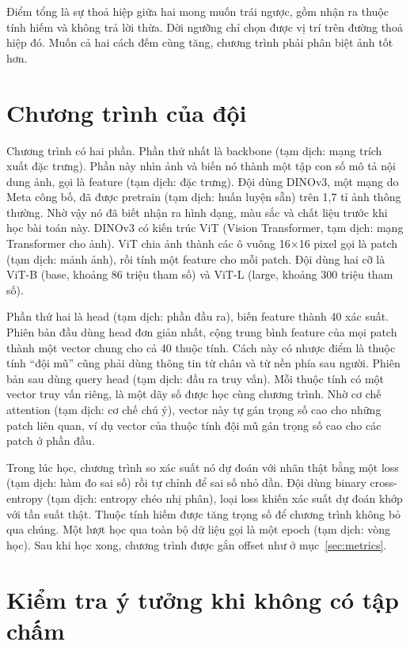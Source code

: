 \documentclass[11pt,a4paper]{article}
\begin{document}
\begin{ghichu}
Điểm tổng là sự thoả hiệp giữa hai mong muốn trái ngược, gồm nhận ra thuộc tính hiếm và không trả lời thừa. Dời ngưỡng chỉ chọn được vị trí trên đường thoả hiệp đó. Muốn cả hai cách đếm cùng tăng, chương trình phải phân biệt ảnh tốt hơn.
\end{ghichu}

\section{Chương trình của đội}
\label{sec:system}

Chương trình có hai phần. Phần thứ nhất là backbone (tạm dịch: mạng trích xuất đặc trưng). Phần này nhìn ảnh và biến nó thành một tập con số mô tả nội dung ảnh, gọi là feature (tạm dịch: đặc trưng). Đội dùng DINOv3, một mạng do Meta công bố, đã được pretrain (tạm dịch: huấn luyện sẵn) trên 1,7 tỉ ảnh thông thường. Nhờ vậy nó đã biết nhận ra hình dạng, màu sắc và chất liệu trước khi học bài toán này. DINOv3 có kiến trúc ViT (Vision Transformer, tạm dịch: mạng Transformer cho ảnh). ViT chia ảnh thành các ô vuông 16×16 pixel gọi là patch (tạm dịch: mảnh ảnh), rồi tính một feature cho mỗi patch. Đội dùng hai cỡ là ViT-B (base, khoảng 86 triệu tham số) và ViT-L (large, khoảng 300 triệu tham số).

Phần thứ hai là head (tạm dịch: phần đầu ra), biến feature thành 40 xác suất. Phiên bản đầu dùng head đơn giản nhất, cộng trung bình feature của mọi patch thành một vector chung cho cả 40 thuộc tính. Cách này có nhược điểm là thuộc tính ``đội mũ'' cũng phải dùng thông tin từ chân và từ nền phía sau người. Phiên bản sau dùng query head (tạm dịch: đầu ra truy vấn). Mỗi thuộc tính có một vector truy vấn riêng, là một dãy số được học cùng chương trình. Nhờ cơ chế attention (tạm dịch: cơ chế chú ý), vector này tự gán trọng số cao cho những patch liên quan, ví dụ vector của thuộc tính đội mũ gán trọng số cao cho các patch ở phần đầu.

Trong lúc học, chương trình so xác suất nó dự đoán với nhãn thật bằng một loss (tạm dịch: hàm đo sai số) rồi tự chỉnh để sai số nhỏ dần. Đội dùng binary cross-entropy (tạm dịch: entropy chéo nhị phân), loại loss khiến xác suất dự đoán khớp với tần suất thật. Thuộc tính hiếm được tăng trọng số để chương trình không bỏ qua chúng. Một lượt học qua toàn bộ dữ liệu gọi là một epoch (tạm dịch: vòng học). Sau khi học xong, chương trình được gắn offset như ở mục~\ref{sec:metrics}.

\section{Kiểm tra ý tưởng khi không có tập chấm}
\label{sec:proxy}
\end{document}
